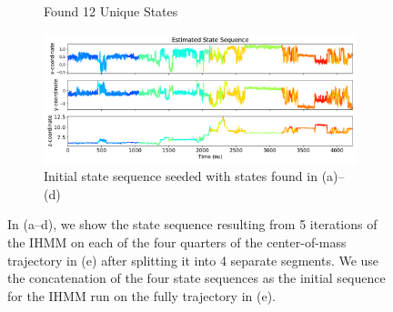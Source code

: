 \documentclass{article}
\begin{document}
\begin{figure}
\begin{subfigure}{0.48\textwidth}
  \caption{Found 12 Unique States}\label{fig:segment4}
  \end{subfigure}
  \begin{subfigure}{1\textwidth}
  \includegraphics[width=\textwidth]{seed_ACH21_full.pdf}
  \caption{Initial state sequence seeded with states found in (a)--(d)}\label{fig:full}
  \end{subfigure}
  \caption{In (a--d), we show the state sequence resulting from 5 iterations
  of the IHMM on each of the four quarters of the center-of-mass trajectory in
  (e) after splitting it into 4 separate segments. We use the concatenation 
  of the four state sequences as the initial sequence for the IHMM run on the 
  fully trajectory in (e).
  }\label{fig:seed_sequence}
  \end{figure}
  
\end{document}
